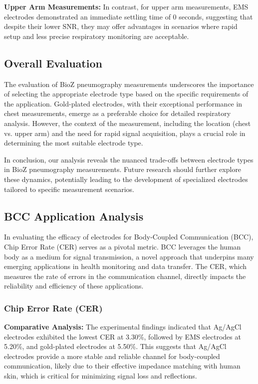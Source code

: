 \documentclass[conference]{IEEEtran}
\begin{document}
\textbf{Upper Arm Measurements:} In contrast, for upper arm measurements, EMS electrodes demonstrated an immediate settling time of 0 seconds, suggesting that despite their lower SNR, they may offer advantages in scenarios where rapid setup and less precise respiratory monitoring are acceptable.

\subsection{Overall Evaluation}

The evaluation of BioZ pneumography measurements underscores the importance of selecting the appropriate electrode type based on the specific requirements of the application. Gold-plated electrodes, with their exceptional performance in chest measurements, emerge as a preferable choice for detailed respiratory analysis. However, the context of the measurement, including the location (chest vs. upper arm) and the need for rapid signal acquisition, plays a crucial role in determining the most suitable electrode type.

In conclusion, our analysis reveals the nuanced trade-offs between electrode types in BioZ pneumography measurements. Future research should further explore these dynamics, potentially leading to the development of specialized electrodes tailored to specific measurement scenarios.

\subsection{BCC Application Analysis}

In evaluating the efficacy of electrodes for Body-Coupled Communication (BCC), Chip Error Rate (CER) serves as a pivotal metric. BCC leverages the human body as a medium for signal transmission, a novel approach that underpins many emerging applications in health monitoring and data transfer. The CER, which measures the rate of errors in the communication channel, directly impacts the reliability and efficiency of these applications.

\subsubsection{Chip Error Rate (CER)}

\textbf{Comparative Analysis:} The experimental findings indicated that Ag/AgCl electrodes exhibited the lowest CER at 3.30\%, followed by EMS electrodes at 5.20\%, and gold-plated electrodes at 5.50\%. This suggests that Ag/AgCl electrodes provide a more stable and reliable channel for body-coupled communication, likely due to their effective impedance matching with human skin, which is critical for minimizing signal loss and reflections.
\end{document}
